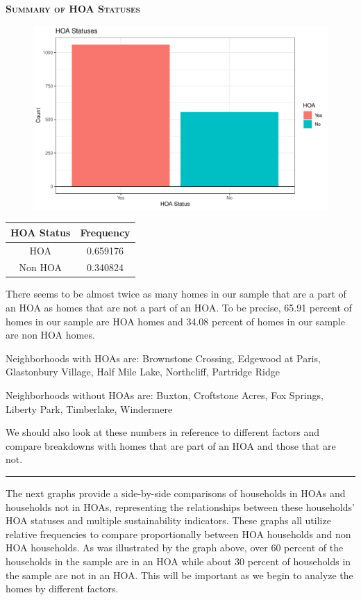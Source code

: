 \documentclass{article}
\begin{document}
\textsc{\textbf{Summary of HOA Statuses}}
\newline
\newline
	\begin{figure}[H]
		\centering
\includegraphics{exam23-008}
\label{Fig:plot1}
	\end{figure}
\begin{table}[h]
\begin{tabular}{|c|c|} \hline
HOA Status & Frequency \\ \hline
HOA        & 0.659176  \\ \hline
Non HOA    & 0.340824 \\ \hline
\end{tabular}
\end{table}

There seems to be almost twice as many homes in our sample that are a part of an HOA as homes that are not a part of an HOA. To be precise, 65.91 percent of homes in our sample are HOA homes and 34.08 percent of homes in our sample are non HOA homes. 

Neighborhoods with HOAs are: Brownstone Crossing, Edgewood at Paris, Glastonbury Village, Half Mile Lake, Northcliff, Partridge Ridge

Neighborhoods without HOAs are: Buxton, Croftstone Acres, Fox Springs, Liberty Park, Timberlake, Windermere

We should also look at these numbers in reference to different factors and compare breakdowns with homes that are part of an HOA and those that are not.

\noindent\rule{16cm}{0.4pt}
\newline
The next graphs provide a side-by-side comparisons of households in HOAs and households not in HOAs, representing the relationships between these households' HOA statuses and multiple sustainability indicators. These graphs all utilize relative frequencies to compare proportionally between HOA households and non HOA households. As was illustrated by the graph above, over 60 percent of the households in the sample are in an HOA while about 30 percent of households in the sample are not in an HOA. This will be important as we begin to analyze the homes by different factors. 
\end{document}

